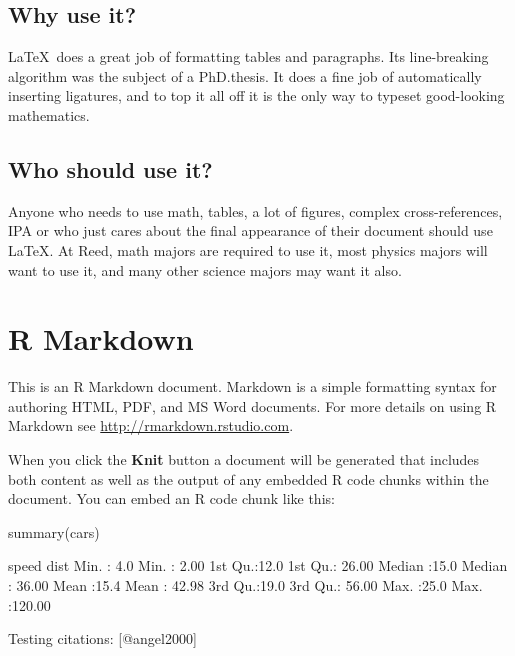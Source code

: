 \documentclass[12pt,twoside]{reedthesis}
\begin{document}
  \section{Why use it?}
  
  \LaTeX~does a great job of formatting tables and paragraphs. Its
  line-breaking algorithm was the subject of a PhD.\thinspace thesis. It
  does a fine job of automatically inserting ligatures, and to top it all
  off it is the only way to typeset good-looking mathematics.
  
  \section{Who should use it?}
  
  Anyone who needs to use math, tables, a lot of figures, complex
  cross-references, IPA or who just cares about the final appearance of
  their document should use \LaTeX. At Reed, math majors are required to
  use it, most physics majors will want to use it, and many other science
  majors may want it also.
  
  \chapter{R Markdown}
  
  This is an R Markdown document. Markdown is a simple formatting syntax
  for authoring HTML, PDF, and MS Word documents. For more details on
  using R Markdown see \url{http://rmarkdown.rstudio.com}.
  
  When you click the \textbf{Knit} button a document will be generated
  that includes both content as well as the output of any embedded R code
  chunks within the document. You can embed an R code chunk like this:
  
  \begin{CodeChunk}
  \begin{CodeInput}
  summary(cars)
  \end{CodeInput}
  \begin{CodeOutput}
       speed           dist       
   Min.   : 4.0   Min.   :  2.00  
   1st Qu.:12.0   1st Qu.: 26.00  
   Median :15.0   Median : 36.00  
   Mean   :15.4   Mean   : 42.98  
   3rd Qu.:19.0   3rd Qu.: 56.00  
   Max.   :25.0   Max.   :120.00  
  \end{CodeOutput}
  \end{CodeChunk}
  
  Testing citations: \cite{angel2000} {[}@angel2000{]}
  
\end{document}
